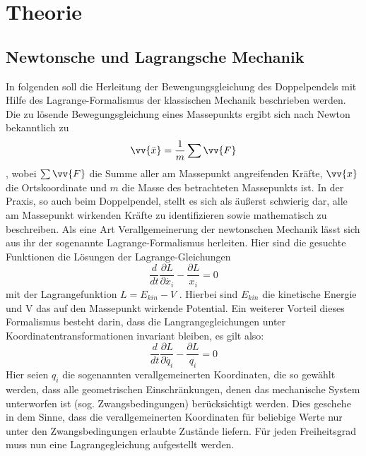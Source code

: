\section{Theorie}
\subsection{Newtonsche und Lagrangsche Mechanik}
In folgenden soll die Herleitung der Bewengungsgleichung des Doppelpendels mit Hilfe des Lagrange-Formalismus der klassischen Mechanik beschrieben werden. \\
Die zu lösende Bewegungsgleichung eines Massepunkts ergibt sich nach Newton bekanntlich zu \begin{equation}
\vv{\ddot{x}}=\frac{1}{m}\sum \vv{F}
\end{equation}, 
wobei $ \sum \vv{F} $ die Summe aller am Massepunkt angreifenden Kräfte, $\vv{x} $ die Ortskoordinate und $ m $ die Masse des betrachteten Massepunkts ist.
In der Praxis, so auch beim Doppelpendel, stellt es sich als äußerst schwierig dar, alle am Massepunkt wirkenden Kräfte zu identifizieren sowie mathematisch zu beschreiben. Als eine Art Verallgemeinerung der newtonschen Mechanik lässt sich aus ihr der sogenannte Lagrange-Formalismus herleiten. Hier sind die gesuchte Funktionen die Lösungen der Lagrange-Gleichungen
\begin{equation}
\frac{d}{dt}\frac{\partial L}{\partial\dot{x_i}}-\frac{\partial L}{x_i} = 0
\end{equation}
mit der Lagrangefunktion  $ L=E_{kin} - V $ . Hierbei sind $E_{kin}$ die kinetische Energie und V das auf den Massepunkt wirkende Potential. Ein weiterer Vorteil dieses Formalismus besteht darin, dass die Langrangegleichungen unter Koordinatentransformationen invariant bleiben, es gilt also:
\begin{equation}
\frac{d}{dt}\frac{\partial L}{\partial\dot{q_i}}-\frac{\partial L}{q_i} = 0
\end{equation}
Hier seien $q_i$ die sogenannten verallgemeinerten Koordinaten, die so gewählt werden, dass alle geometrischen Einschränkungen, denen das mechanische System unterworfen ist (sog. Zwangsbedingungen) berücksichtigt werden. Dies geschehe in dem Sinne, dass die verallgemeinerten Koordinaten für beliebige Werte nur unter den Zwangsbedingungen erlaubte Zustände liefern. Für jeden Freiheitsgrad muss nun eine Lagrangegleichung aufgestellt werden.
